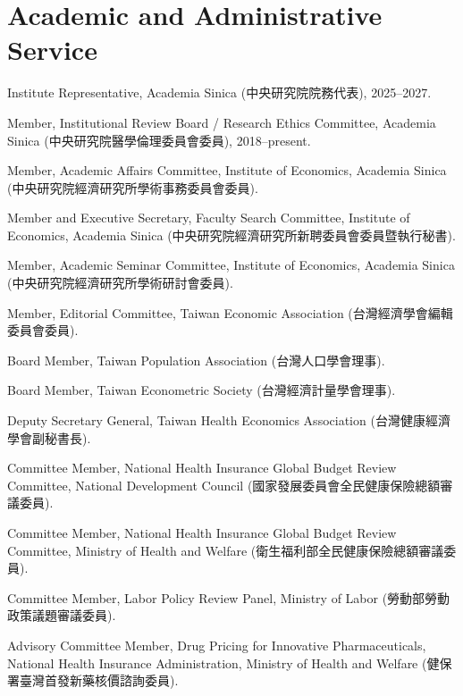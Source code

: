 \documentclass[10pt,letterpaper]{article}
\renewenvironment{itemize}{
  \begin{list}{}{
      \setlength{\leftmargin}{1.5em}
      \setlength{\itemsep}{0.25em}
      \setlength{\parskip}{0pt}
      \setlength{\parsep}{0.25em}
    }
}{
  \end{list}
}
\begin{document}
\section*{\textbf{Academic and Administrative Service}}

\begin{itemize}
  \item Institute Representative, Academia Sinica (中央研究院院務代表), 2025--2027.
  
  \item Member, Institutional Review Board / Research Ethics Committee, Academia Sinica  
  (中央研究院醫學倫理委員會委員), 2018--present.
  
  \item Member, Academic Affairs Committee,  
  Institute of Economics, Academia Sinica  
  (中央研究院經濟研究所學術事務委員會委員).
  
  \item Member and Executive Secretary, Faculty Search Committee,  
  Institute of Economics, Academia Sinica  
  (中央研究院經濟研究所新聘委員會委員暨執行秘書).
  
  \item Member, Academic Seminar Committee,  
  Institute of Economics, Academia Sinica  
  (中央研究院經濟研究所學術研討會委員).
  
  \item Member, Editorial Committee, Taiwan Economic Association  
  (台灣經濟學會編輯委員會委員).
  
  \item Board Member, Taiwan Population Association  
  (台灣人口學會理事).
  
  \item Board Member, Taiwan Econometric Society  
  (台灣經濟計量學會理事).
  
  \item Deputy Secretary General, Taiwan Health Economics Association  
  (台灣健康經濟學會副秘書長).
  
  \item Committee Member, National Health Insurance Global Budget Review Committee,  
  National Development Council  
  (國家發展委員會全民健康保險總額審議委員).
  
  \item Committee Member, National Health Insurance Global Budget Review Committee,  
  Ministry of Health and Welfare  
  (衛生福利部全民健康保險總額審議委員).
  
  \item Committee Member, Labor Policy Review Panel, Ministry of Labor  
  (勞動部勞動政策議題審議委員).
  
  \item Advisory Committee Member, Drug Pricing for Innovative Pharmaceuticals,  
  National Health Insurance Administration, Ministry of Health and Welfare  
  (健保署臺灣首發新藥核價諮詢委員).
\end{itemize}
\end{document}
